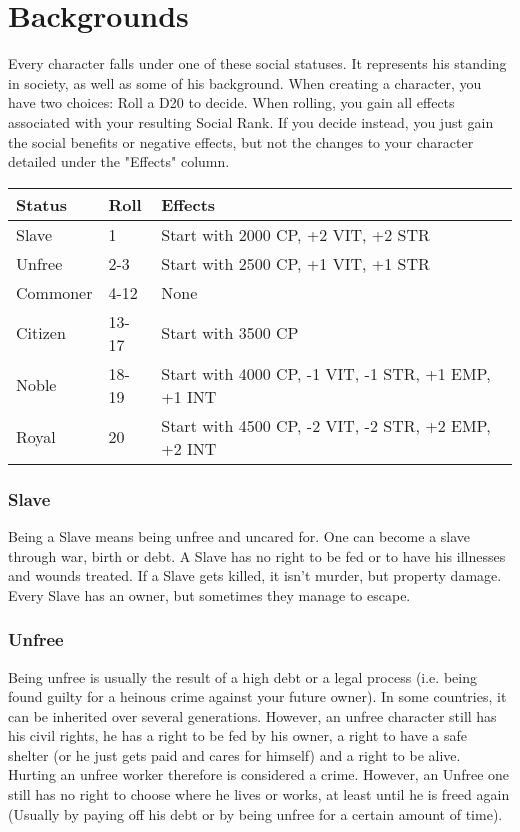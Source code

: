 \chapter{Backgrounds}
Every character falls under one of these social statuses. It represents his standing in society, as well as some of his background. When creating a character, you have two choices: Roll a D20 to decide. When rolling, you gain all effects associated with your resulting Social Rank. If you decide instead, you just gain the social benefits or negative effects, but not the changes to your character detailed under the "Effects" column.\\

\begin{tabular}{l | l | p{7.5cm}}
	Status & Roll & Effects\\ \hline
	Slave & 1 & Start with 2000 CP, +2 VIT, +2 STR\\
	Unfree & 2-3 & Start with 2500 CP, +1 VIT, +1 STR\\
	Commoner & 4-12 & None\\
	Citizen & 13-17 & Start with 3500 CP\\
	Noble & 18-19 & Start with 4000 CP, -1 VIT, -1 STR, +1 EMP, +1 INT\\
	Royal & 20 & Start with 4500 CP, -2 VIT, -2 STR, +2 EMP, +2 INT
\end{tabular}

\subsection{Slave}

Being a Slave means being unfree and uncared for. One can become a slave through war, birth or debt. A Slave has no right to be fed or to have his illnesses and wounds treated. If a Slave gets killed, it isn’t murder, but property damage. Every Slave has an owner, but sometimes they manage to escape. 

\subsection{Unfree}

Being unfree is usually the result of a high debt or a legal process (i.e. being found guilty for a heinous crime against your future owner). In some countries, it can be inherited over several generations. However, an unfree character still has his civil rights, he has a right to be fed by his owner, a right to have a safe shelter (or he just gets paid and cares for himself) and a right to be alive. Hurting an unfree worker therefore is considered a crime. However, an Unfree one still has no right to choose where he lives or works, at least until he is freed again (Usually by paying off his debt or by being unfree for a certain amount of time).

